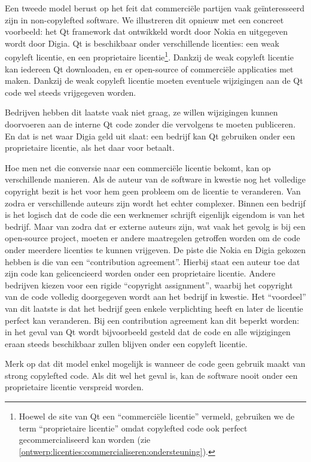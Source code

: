 Een tweede model berust op het feit dat commerciële partijen vaak geïnteresseerd zijn in non-copylefted software. We illustreren dit opnieuw met een concreet voorbeeld: het Qt framework dat ontwikkeld wordt door Nokia en uitgegeven wordt door Digia. Qt is beschikbaar onder verschillende licenties: een weak copyleft licentie, en een proprietaire licentie\footnote{Hoewel de site van Qt een ``commerciële licentie'' vermeld, gebruiken we de term ``proprietaire licentie'' omdat copylefted code ook perfect gecommercialiseerd kan worden (zie \ref{ontwerp:licenties:commercialiseren:ondersteuning}).}. Dankzij de weak copyleft licentie kan iedereen Qt downloaden, en er open-source of commerciële applicaties met maken. Dankzij de weak copyleft licentie moeten eventuele wijzigingen aan de Qt code wel steeds vrijgegeven worden.

Bedrijven hebben dit laatste vaak niet graag, ze willen wijzigingen kunnen doorvoeren aan de interne Qt code zonder die vervolgens te moeten publiceren. En dat is net waar Digia geld uit slaat: een bedrijf kan Qt gebruiken onder een proprietaire licentie, als het daar voor betaalt.

Hoe men net die conversie naar een commerciële licentie bekomt, kan op verschillende manieren. Als de auteur van de software in kwestie nog het volledige copyright bezit is het voor hem geen probleem om de licentie te veranderen. Van zodra er verschillende auteurs zijn wordt het echter complexer. Binnen een bedrijf is het logisch dat de code die een werknemer schrijft eigenlijk eigendom is van het bedrijf. Maar van zodra dat er externe auteurs zijn, wat vaak het gevolg is bij een open-source project, moeten er andere maatregelen getroffen worden om de code onder meerdere licenties te kunnen vrijgeven. De piste die Nokia en Digia gekozen hebben is die van een ``contribution agreement''. Hierbij staat een auteur toe dat zijn code kan gelicencieerd worden onder een proprietaire licentie. Andere bedrijven kiezen voor een rigide ``copyright assignment'', waarbij het copyright van de code volledig doorgegeven wordt aan het bedrijf in kwestie. Het ``voordeel'' van dit laatste is dat het bedrijf geen enkele verplichting heeft en later de licentie perfect kan veranderen. Bij een contribution agreement kan dit beperkt worden: in het geval van Qt wordt bijvoorbeeld gesteld dat de code en alle wijzigingen eraan steeds beschikbaar zullen blijven onder een copyleft licentie.

Merk op dat dit model enkel mogelijk is wanneer de code geen gebruik maakt van strong copylefted code. Als dit wel het geval is, kan de software nooit onder een proprietaire licentie verspreid worden.

